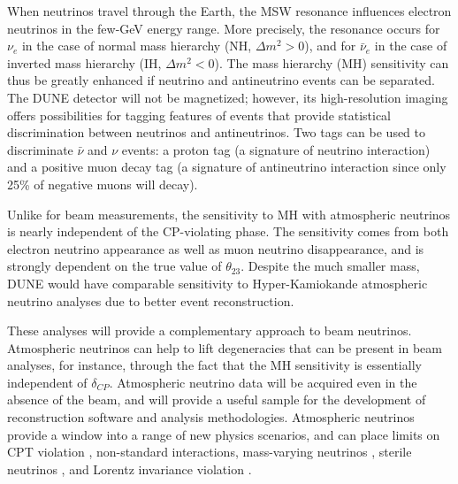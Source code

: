 When neutrinos travel through the Earth, the MSW resonance influences electron neutrinos in the few-GeV energy range. More precisely, the resonance occurs for $\nu_e$ in the case of normal mass hierarchy (NH, $\Delta m^2 > 0$), and for $\bar \nu_e$ in the case of inverted mass hierarchy (IH, $\Delta m^2 < 0$). 
The mass hierarchy (MH) sensitivity can thus be greatly enhanced if neutrino and antineutrino events can be separated. The DUNE detector will not be magnetized; however, its high-resolution imaging offers possibilities for tagging features of events that provide statistical discrimination between neutrinos
and antineutrinos. Two tags can be used to discriminate $\bar \nu$  and $\nu$ events: a proton tag (a signature of neutrino interaction) and a positive muon decay tag (a signature of antineutrino interaction since only 25\% of negative muons will decay).

Unlike for beam measurements, the sensitivity to MH with atmospheric neutrinos is nearly independent of the CP-violating phase. The sensitivity comes
from both electron neutrino appearance as well as muon neutrino disappearance, and is strongly dependent on the true value of $\theta_{23}$. Despite the much smaller mass, DUNE would have comparable sensitivity to Hyper-Kamiokande atmospheric neutrino analyses due to better event reconstruction.

These analyses will provide a complementary approach to beam neutrinos. Atmospheric neutrinos can help to lift degeneracies that can be present in beam analyses, for instance, through the fact that the MH sensitivity is essentially independent of $\delta_{CP}$. Atmospheric neutrino data will be acquired even in the absence of the beam, and will provide a useful sample for the development of reconstruction software and analysis methodologies. Atmospheric neutrinos provide a window into a range of new physics scenarios, and can place limits on CPT violation \cite{Kostelecky:2003cr}, non-standard interactions, mass-varying neutrinos \cite{Abe:2008zza}, sterile neutrinos \cite{Abe:2014gda}, and Lorentz invariance violation \cite{Kostelecky:2011gq}.

